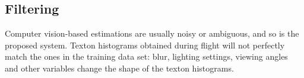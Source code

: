 \documentclass{report}
\begin{document}

\subsection{Filtering}
\label{sec:filtering}

Computer vision-based estimations are usually noisy or ambiguous, and
so is the proposed system. Texton histograms obtained during flight
will not perfectly match the ones in the training data set: blur,
lighting settings, viewing angles and other variables change the shape
of the texton histograms.
\end{document}
